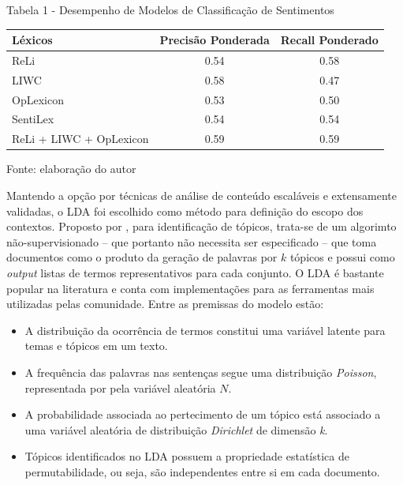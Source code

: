 \documentclass[
12pt,				%
openright,			%
twoside,			%
a4paper,			%
english,			%
french,				%
spanish,			%
brazil				%
]{abntex2}
\begin{document}
\begin{center}
	Tabela 1 - Desempenho de Modelos de Classificação de Sentimentos
	
	\vspace{0.4cm}
	
	\begin{tabular}{lcc}
		\toprule
		{Léxicos}					& {Precisão Ponderada} 	& {Recall Ponderado} \\ \midrule
		{ReLi} 						& 0.54					& 0.58 \\ 
		{LIWC} 						& 0.58					& 0.47 \\ 
		{OpLexicon} 				& 0.53					& 0.50 \\ 
		{SentiLex} 					& 0.54					& 0.54 \\ 
		{ReLi + LIWC + OpLexicon} 	& 0.59					& 0.59 \\ 
		\bottomrule
	\end{tabular}
	
	\vspace{0.6cm}
	
	Fonte: elaboração do autor
\end{center}     

Mantendo a opção por técnicas de análise de conteúdo escaláveis e extensamente validadas, o LDA foi escolhido como método para definição do escopo dos contextos. Proposto por , para identificação de tópicos, trata-se de um algorimto não-supervisionado -- que portanto não necessita ser especificado -- que toma documentos como o produto da geração de palavras por $k$ tópicos e possui como \emph{output} listas de termos representativos para cada conjunto. O LDA é bastante popular na literatura e conta com implementações para as ferramentas mais utilizadas pelas comunidade. Entre as premissas do modelo estão:

\begin{itemize}
	\item A distribuição da ocorrência de termos constitui uma variável latente para temas e tópicos em um texto.
	\item A frequência das palavras nas sentenças segue uma distribuição \emph{Poisson}, representada por pela variável aleatória $N$.
	\item A probabilidade associada ao pertecimento de um tópico está associado a uma variável aleatória de distribuição \emph{Dirichlet} de dimensão \emph{k}.
	\item Tópicos identificados no LDA possuem a propriedade estatística de permutabilidade, ou seja, são independentes entre si em cada documento. 
\end{itemize}
\end{document}

